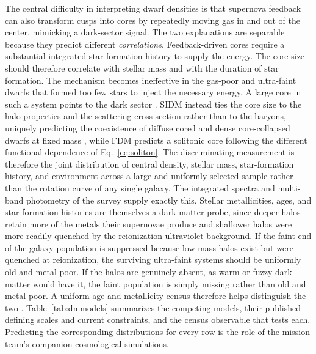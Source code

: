 \documentclass[10pt,onecolumn]{article}
\begin{document}
The central difficulty in interpreting dwarf densities is that supernova feedback can also transform cusps into cores by repeatedly moving gas in and out of the center, mimicking a dark-sector signal. The two explanations are separable because they predict different \emph{correlations}. Feedback-driven cores require a substantial integrated star-formation history to supply the energy. The core size should therefore correlate with stellar mass and with the duration of star formation. The mechanism becomes ineffective in the gas-poor and ultra-faint dwarfs that formed too few stars to inject the necessary energy. A large core in such a system points to the dark sector \cite{deblok2010,bullock2017}. SIDM instead ties the core size to the halo properties and the scattering cross section rather than to the baryons, uniquely predicting the coexistence of diffuse cored and dense core-collapsed dwarfs at fixed mass \cite{kaplinghat2016,ren2019}, while FDM predicts a solitonic core following the different functional dependence of Eq.~\eqref{eq:soliton}. The discriminating measurement is therefore the joint distribution of central density, stellar mass, star-formation history, and environment across a large and uniformly selected sample rather than the rotation curve of any single galaxy. The integrated spectra and multi-band photometry of the survey supply exactly this. Stellar metallicities, ages, and star-formation histories are themselves a dark-matter probe, since deeper halos retain more of the metals their supernovae produce and shallower halos were more readily quenched by the reionization ultraviolet background. If the faint end of the galaxy population is suppressed because low-mass halos exist but were quenched at reionization, the surviving ultra-faint systems should be uniformly old and metal-poor. If the halos are genuinely absent, as warm or fuzzy dark matter would have it, the faint population is simply missing rather than old and metal-poor. A uniform age and metallicity census therefore helps distinguish the two \cite{kirby2013}. Table~\ref{tab:dmmodels} summarizes the competing models, their published defining scales and current constraints, and the census observable that tests each. Predicting the corresponding distributions for every row is the role of the mission team's companion cosmological simulations.
\end{document}
